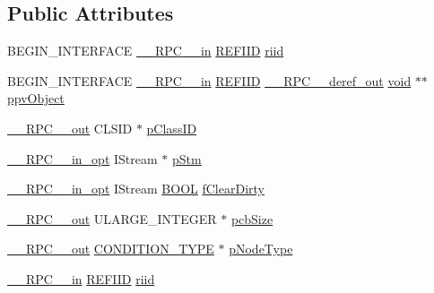 \subsection*{Public Attributes}
\begin{DoxyCompactItemize}
\item 
B\+E\+G\+I\+N\+\_\+\+I\+N\+T\+E\+R\+F\+A\+CE \hyperlink{rpcsal_8h_a20b7f6da600a05c8b541659f14f7f0e6}{\+\_\+\+\_\+\+R\+P\+C\+\_\+\+\_\+in} \hyperlink{px__win__ds_8c_a80ec49c8ae61e234197d5071d2df497d}{R\+E\+F\+I\+ID} \hyperlink{struct_i_condition_vtbl_a21a9bcd301e11efa3789f729d31145f5}{riid}
\item 
B\+E\+G\+I\+N\+\_\+\+I\+N\+T\+E\+R\+F\+A\+CE \hyperlink{rpcsal_8h_a20b7f6da600a05c8b541659f14f7f0e6}{\+\_\+\+\_\+\+R\+P\+C\+\_\+\+\_\+in} \hyperlink{px__win__ds_8c_a80ec49c8ae61e234197d5071d2df497d}{R\+E\+F\+I\+ID} \hyperlink{rpcsal_8h_a23bc188526f10656f9c79d950f6c3192}{\+\_\+\+\_\+\+R\+P\+C\+\_\+\+\_\+deref\+\_\+out} \hyperlink{sound_8c_ae35f5844602719cf66324f4de2a658b3}{void} $\ast$$\ast$ \hyperlink{struct_i_condition_vtbl_ab0669152b1eced3f7eff77f1647375f6}{ppv\+Object}
\item 
\hyperlink{rpcsal_8h_aa518a2c78d44d75f3685c32c455c5ed8}{\+\_\+\+\_\+\+R\+P\+C\+\_\+\+\_\+out} C\+L\+S\+ID $\ast$ \hyperlink{struct_i_condition_vtbl_afe94483f5c328cd3667db0549dd55267}{p\+Class\+ID}
\item 
\hyperlink{rpcsal_8h_a6e152ac84637d70f0453366759b3b9fb}{\+\_\+\+\_\+\+R\+P\+C\+\_\+\+\_\+in\+\_\+opt} I\+Stream $\ast$ \hyperlink{struct_i_condition_vtbl_a0ce00915c819d82082ff25ade0b6f8de}{p\+Stm}
\item 
\hyperlink{rpcsal_8h_a6e152ac84637d70f0453366759b3b9fb}{\+\_\+\+\_\+\+R\+P\+C\+\_\+\+\_\+in\+\_\+opt} I\+Stream \hyperlink{nfilterkit_8h_a3be13892ae7076009afcf121347dd319}{B\+O\+OL} \hyperlink{struct_i_condition_vtbl_a5f41e1ab9a3f04dec7adff83ae072768}{f\+Clear\+Dirty}
\item 
\hyperlink{rpcsal_8h_aa518a2c78d44d75f3685c32c455c5ed8}{\+\_\+\+\_\+\+R\+P\+C\+\_\+\+\_\+out} U\+L\+A\+R\+G\+E\+\_\+\+I\+N\+T\+E\+G\+ER $\ast$ \hyperlink{struct_i_condition_vtbl_a7a922f64ccebbc2ccdf4935c638e9e47}{pcb\+Size}
\item 
\hyperlink{rpcsal_8h_aa518a2c78d44d75f3685c32c455c5ed8}{\+\_\+\+\_\+\+R\+P\+C\+\_\+\+\_\+out} \hyperlink{structuredquery_8h_afbbe55e1cea689df1b4eadd5be61ca43}{C\+O\+N\+D\+I\+T\+I\+O\+N\+\_\+\+T\+Y\+PE} $\ast$ \hyperlink{struct_i_condition_vtbl_a3d64a605f03702dbbe7c5d4903f6d0cc}{p\+Node\+Type}
\item 
\hyperlink{rpcsal_8h_a20b7f6da600a05c8b541659f14f7f0e6}{\+\_\+\+\_\+\+R\+P\+C\+\_\+\+\_\+in} \hyperlink{px__win__ds_8c_a80ec49c8ae61e234197d5071d2df497d}{R\+E\+F\+I\+ID} \hyperlink{struct_i_condition_vtbl_a4017cd80e29e3931243189463d80549e}{riid}
$$
\end{DoxyCompactItemize}
